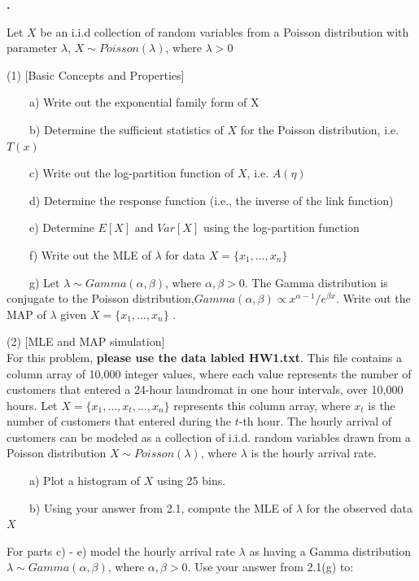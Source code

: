 \documentclass{article}
\newcounter{pcounter}                                   %
\newenvironment{problem}                                %
{                                                       %
    \stepcounter{pcounter}                              %
    \textbf{\arabic{pcounter}.}                         %
}{}                                                     %
\newcommand{\tab}{\ \ \ \ }                             %
\begin{document}
    \begin{problem}
        Let $X$ be an i.i.d collection of random variables from a Poisson distribution with parameter $\lambda$, $X \sim Poisson(\lambda)$, where $\lambda > 0$

        (1) [Basic Concepts and Properties]

        \tab a) Write out the exponential family form of X
        
        \tab b) Determine the sufficient statistics of $X$ for the Poisson distribution, i.e. $T(x)$
        
        \tab c) Write out the log-partition function of $X$, i.e. $A(\eta)$
        
        \tab d) Determine the response function (i.e., the inverse of the link function)
        
        \tab e) Determine $E[X]$ and $Var[X]$ using the log-partition function
        
        \tab f) Write out the MLE of $\lambda$ for data $X=\{x_1, \dots, x_n\}$
        
        \tab g) Let $\lambda \sim Gamma(\alpha, \beta)$, where $\alpha, \beta > 0$. The Gamma distribution is conjugate to the Poisson distribution,$ Gamma(\alpha, \beta) \propto x^{\alpha - 1} / e^{\beta x}$. Write out the MAP of $\lambda$ given $X=\{x_1, \dots, x_n\}$ .

        (2) [MLE and MAP simulation] \\
        For this problem, \textbf{please use the data labled HW1.txt}. This file contains a column array of 10,000 integer values, where each value represents the number of customers that entered a 24-hour laundromat in one hour intervals, over 10,000 hours.
        Let $X = \{x_1, \dots, x_t, \dots, x_n\}$ represents this column array, where $x_t$ is the number of customers that entered during the $t$-th hour. The hourly arrival of customers can be modeled as a collection of i.i.d. random variables drawn from a Poisson distribution $X \sim Poisson(\lambda)$, where $\lambda$ is the hourly arrival rate.
        
        \tab a) Plot a histogram of $X$ using 25 bins.
        
        \tab b) Using your answer from 2.1, compute the MLE of $\lambda$ for the observed data $X$ 

        For parts c) - e) model the hourly arrival rate $\lambda$ as having a Gamma distribution $\lambda \sim Gamma(\alpha, \beta)$, where $\alpha, \beta > 0$. Use your answer from 2.1(g) to:
        

\end{problem}
\end{document}
